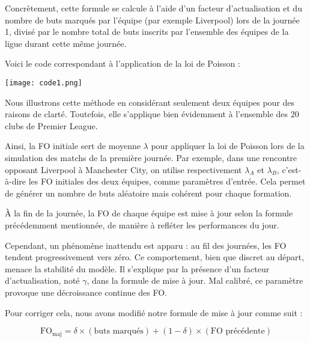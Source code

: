 \documentclass[12pt]{report}
\begin{document}
Concrètement, cette formule se calcule à l’aide d’un facteur d’actualisation et du nombre de buts marqués par l’équipe (par exemple Liverpool) lors de la journée 1, divisé par le nombre total de buts inscrits par l’ensemble des équipes de la ligue durant cette même journée.

Voici le code correspondant à l’application de la loi de Poisson :
\begin{tcolorbox}[
  colback=white, colframe=red!80!black,
  title=\textcolor{white}{\textbf{Simulation d’un score}},
  coltitle=white, colbacktitle=red!80!black,
  boxrule=0.8pt,
  left=4pt, right=4pt, top=5pt, bottom=5pt,
  boxsep=5pt,
  enhanced, sharp corners
]
\centering
\texttt{[image: code1.png]}
\end{tcolorbox}


Nous illustrons cette méthode en considérant seulement deux équipes pour des raisons de clarté. Toutefois, elle s’applique bien évidemment à l’ensemble des 20 clubs de Premier League.

Ainsi, la FO initiale sert de moyenne $\lambda$ pour appliquer la loi de Poisson lors de la simulation des matchs de la première journée. Par exemple, dans une rencontre opposant Liverpool à Manchester City, on utilise respectivement $\lambda_A$ et $\lambda_B$, c’est-à-dire les FO initiales des deux équipes, comme paramètres d’entrée. Cela permet de générer un nombre de buts aléatoire mais cohérent pour chaque formation.

À la fin de la journée, la FO de chaque équipe est mise à jour selon la formule précédemment mentionnée, de manière à refléter les performances du jour.

Cependant, un phénomène inattendu est apparu : au fil des journées, les FO tendent progressivement vers zéro. Ce comportement, bien que discret au départ, menace la stabilité du modèle. Il s’explique par la présence d’un facteur d’actualisation, noté $\gamma$, dans la formule de mise à jour. Mal calibré, ce paramètre provoque une décroissance continue des FO.

Pour corriger cela, nous avons modifié notre formule de mise à jour comme suit :

\begin{tcolorbox}[colback=white!95!gray, colframe=blue!65!black, title=\textbf{Formule de mise à jour de la FO}]
\[
\text{FO}_{\text{maj}} = \delta \times (\text{buts marqués}) + (1 - \delta) \times (\text{FO précédente})
\]
\end{tcolorbox}
\end{document}
